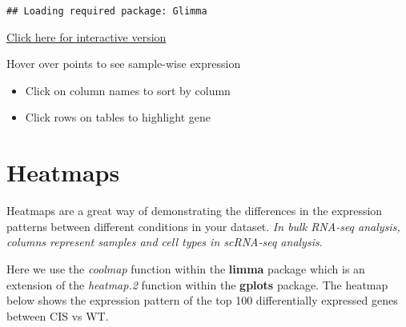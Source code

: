 \documentclass[
  openany]{book}
\newenvironment{Shaded}{\begin{snugshade}}{\end{snugshade}}
\newcommand{\AttributeTok}[1]{\textcolor[rgb]{0.77,0.63,0.00}{#1}}
\newcommand{\DecValTok}[1]{\textcolor[rgb]{0.00,0.00,0.81}{#1}}
\newcommand{\FunctionTok}[1]{\textcolor[rgb]{0.00,0.00,0.00}{#1}}
\newcommand{\NormalTok}[1]{#1}
\newcommand{\SpecialCharTok}[1]{\textcolor[rgb]{0.00,0.00,0.00}{#1}}
\newcommand{\StringTok}[1]{\textcolor[rgb]{0.31,0.60,0.02}{#1}}
\begin{document}
\begin{verbatim}
## Loading required package: Glimma
\end{verbatim}

\begin{Shaded}
\end{Shaded}

\href{glimma-plots/MD-Plot.html}{Click here for interactive version}

Hover over points to see sample-wise expression

\begin{itemize}
\item
  Click on column names to sort by column
\item
  Click rows on tables to highlight gene
\end{itemize}

\hypertarget{heatmaps}{%
\section{Heatmaps}\label{heatmaps}}

Heatmaps are a great way of demonstrating the differences in the expression patterns between different conditions in your dataset. \emph{In bulk RNA-seq analysis, columns represent samples and cell types in scRNA-seq analysis}.

Here we use the \emph{coolmap} function within the \textbf{limma} package which is an extension of the \emph{heatmap.2} function within the \textbf{gplots} package. The heatmap below shows the expression pattern of the top 100 differentially expressed genes between CIS vs WT.
\end{document}
